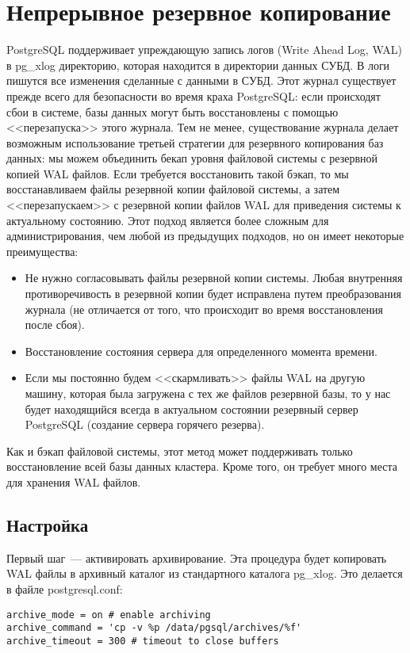 \section{Непрерывное резервное копирование}
PostgreSQL поддерживает упреждающую запись логов (Write Ahead Log, WAL) в pg\_xlog директорию, которая находится в директории 
данных СУБД. 
В логи пишутся все изменения сделанные с данными в СУБД. Этот журнал существует прежде всего для безопасности во 
время краха PostgreSQL: если происходят сбои в системе, базы данных могут быть восстановлены с помощью <<перезапуска>> этого 
журнала. Тем не менее, существование журнала делает возможным использование третьей стратегии для резервного копирования 
баз данных: мы можем объединить бекап уровня файловой системы с резервной копией WAL файлов. Если требуется восстановить такой бэкап, то 
мы восстанавливаем файлы резервной копии файловой системы, а затем <<перезапускаем>> с резервной копии файлов WAL для приведения 
системы к актуальному состоянию. Этот подход является более сложным для администрирования, чем любой из предыдущих подходов, 
но он имеет некоторые преимущества:
\begin{itemize}
\item Не нужно согласовывать файлы резервной копии системы. Любая внутренняя противоречивость в резервной копии будет исправлена 
путем преобразования журнала (не отличается от того, что происходит во время восстановления после сбоя). 
\item Восстановление состояния сервера для определенного момента времени.
\item Если мы постоянно будем <<скармливать>> файлы WAL на другую машину, которая была загружена с тех же файлов резервной базы, 
то у нас будет находящийся всегда в актуальном состоянии резервный сервер PostgreSQL (создание сервера горячего резерва).
\end{itemize}

Как и бэкап файловой системы, этот метод может поддерживать только восстановление всей базы данных кластера. Кроме того, он требует 
много места для хранения WAL файлов.

\subsection{Настройка}
Первый шаг~--- активировать архивирование. Эта процедура будет копировать WAL файлы в архивный каталог из 
стандартного каталога pg\_xlog. Это делается в файле postgresql.conf:
\begin{lstlisting}[label=lst:backups15,caption=Настройка архивирования]
archive_mode = on # enable archiving
archive_command = 'cp -v %p /data/pgsql/archives/%f'
archive_timeout = 300 # timeout to close buffers
\end{lstlisting}

